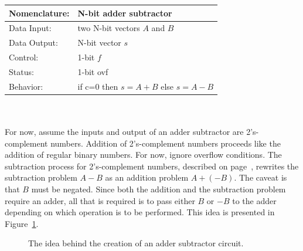 \begin{tabular}{|l|p{3.5in}|} \hline
Nomenclature:  & N-bit adder subtractor                 \\ \hline
Data Input:    & two N-bit vectors $A$ and $B$           \\ \hline  
Data Output:   & N-bit vector  $s$               \\ \hline
Control:       & 1-bit $f$                     \\ \hline
Status:        & 1-bit ovf 				\\ \hline
Behavior:      & if c=0 then $s = A+B$ else $s=A-B$     \\ \hline
\end{tabular}
\\ \\
For now, assume the inputs and output of an adder subtractor are
2's-complement numbers.  Addition of 2's-complement numbers proceeds 
like the addition of regular binary numbers.  For now, 
ignore overflow conditions.  The subtraction process
for 2's-complement numbers, described on page~\pageref{page:2sub}, rewrites
the subtraction problem $A-B$ as an addition problem $A+(-B)$.  The caveat
is that $B$ must be negated.  Since both the addition and the subtraction 
problem
require an adder, all that is required is to pass either $B$ or $-B$ to the
adder depending on which operation is to be performed.  This idea is
presented in Figure~\ref{fig:AddSub}.

\begin{figure}[ht]
\caption{The idea behind the creation of an adder subtractor circuit.}
\label{fig:AddSub}
\end{figure}

